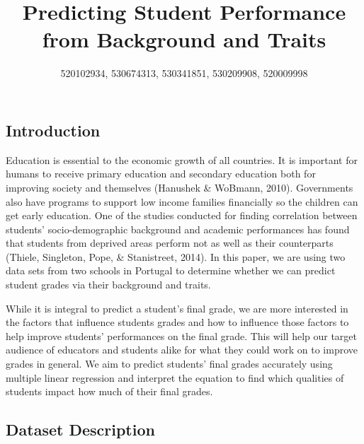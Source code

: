 \documentclass[letterpaper,9pt,twocolumn,twoside,]{pinp}
\title{Predicting Student Performance from Background and Traits}
\author[]{520102934, 530674313, 530341851, 530209908, 520009998}
\begin{document}
\verticaladjustment{-2pt}

\maketitle
\thispagestyle{firststyle}



\subsection{Introduction}\label{introduction}

Education is essential to the economic growth of all countries. It is
important for humans to receive primary education and secondary
education both for improving society and themselves (Hanushek \&
WoBmann, 2010). Governments also have programs to support low income
families financially so the children can get early education. One of the
studies conducted for finding correlation between students'
socio-demographic background and academic performances has found that
students from deprived areas perform not as well as their counterparts
(Thiele, Singleton, Pope, \& Stanistreet, 2014). In this paper, we are
using two data sets from two schools in Portugal to determine whether we
can predict student grades via their background and traits.

While it is integral to predict a student's final grade, we are more
interested in the factors that influence students grades and how to
influence those factors to help improve students' performances on the
final grade. This will help our target audience of educators and
students alike for what they could work on to improve grades in general.
We aim to predict students' final grades accurately using multiple
linear regression and interpret the equation to find which qualities of
students impact how much of their final grades.

\subsection{Dataset Description}\label{dataset-description}
\end{document}
